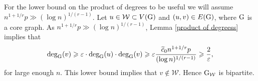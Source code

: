 \documentclass[a4paper,11pt,english,reqno]{amsart}
\numberwithin{equation}{section}
\renewcommand{\geq}{\geqslant}
\newcommand{\W}{\mathcal{W}}
\newcommand{\tu}[1]{\textup{#1}}
\begin{document}
			For the lower bound on the product of degrees to be useful we will assume $n^{1+1/r}p\gg \left(\log n\right)^{1/(r-1)}$. Let $u\in \W\subset V(\tu{G})$ and $(u,v)\in E(\tu{G})$, where $\tu{G}$ is a core graph. As $n^{1+1/r}p \gg (\log n)^{1/(r-1)}$, Lemma \ref{product of degreess} implies that
			\begin{equation}
				\label{bipartite argument}
				\text{deg}_{\tu{G}}(v)\geq \varepsilon\cdot \text{deg}_{\tu{G}}(u)\cdot \text{deg}_{\tu{G}}(v)\geq \varepsilon \frac{\widetilde{c}_{0}n^{1+1/r}p}{(\log n)^{1/(r-1)}} \geq \frac{2}{\varepsilon},
			\end{equation}
			for large enough $n$. This lower bound implies that $v\notin \W$. Hence $\tu{G}_{\W}$ is bipartite.\\
			
			
			
			
			
			
			
			
			
			
			
			
			
			
			
			
			
			
			
			
			
			
			
			
			
			
			
\end{document}
